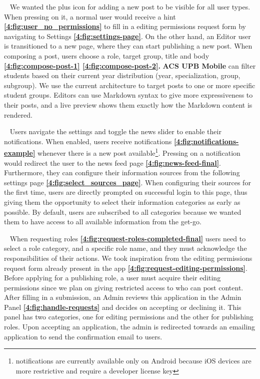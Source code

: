 ~
We wanted the plus icon for adding a new post to be visible for all user types. When pressing on it, a normal user would receive a hint \textbf{\ref{4:fig:user_no_permissions}} to fill in a editing permissions request form by navigating to Settings \textbf{\ref{4:fig:settings-page}}. On the other hand, an Editor user is transitioned to a new page, where they can start publishing a new post. When composing a post, users choose a role, target group, title and body \textbf{\ref{4:fig:compose-post-1} \ref{4:fig:compose-post-2}.} \textbf{ACS UPB Mobile} can filter students based on their current year distribution (year, specialization, group, subgroup). We use the current architecture to target posts to one or more specific student groups. Editors can use Markdown syntax to give more expressiveness to their posts, and a live preview shows them exactly how the Markdown content is rendered.

~
Users navigate the settings and toggle the news slider to enable their notifications. When enabled, users receive notifications \textbf{\ref{4:fig:notifications-example}} whenever there is a new post available\footnote{notifications are currently available only on Android because iOS devices are more restrictive and require a developer license key}. Pressing on a notification would redirect the user to the news feed page \textbf{\ref{4:fig:news-feed-final}}. Furthermore, they can configure their information sources from the following settings page \textbf{\ref{4:fig:select_sources_page}}. When configuring their sources for the first time, users are directly prompted on successful login to this page, thus giving them the opportunity to select their information categories as early as possible. By default, users are subscribed to all categories because we wanted them to have access to all available information from the get-go.

~
When requesting roles \textbf{\ref{4:fig:request-roles-completed-final}} users need to select a role category, and a specific role name, and they must acknowledge the responsibilities of their actions. We took inspiration from the editing permissions request form already present in the app \textbf{\ref{4:fig:request-editing-permissions}}. Before applying for a publishing role, a user must acquire their editing permissions since we plan on giving restricted access to who can post content. After filling in a submission, an Admin reviews this application in the Admin Panel \textbf{\ref{4:fig:handle-requests}} and decides on accepting or declining it. This panel has two categories, one for editing permissions and the other for publishing roles. Upon accepting an application, the admin is redirected towards an emailing application to send the confirmation email to users. 

